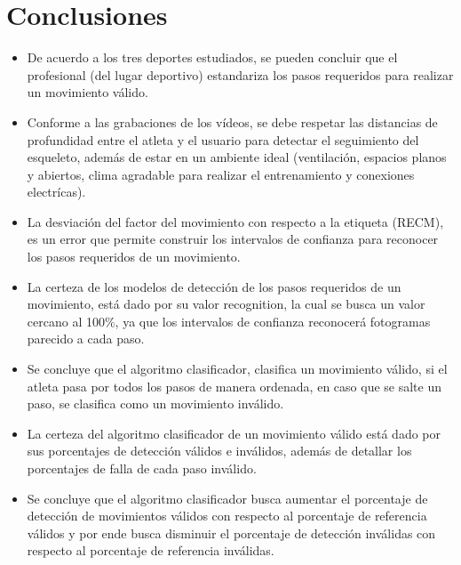 \section{Conclusiones} \label{ded:con}
\begin{itemize}
\item De acuerdo a los tres deportes estudiados, se pueden concluir que el profesional (del lugar deportivo) estandariza los pasos requeridos para realizar un movimiento v\'alido.
\item Conforme a las grabaciones de los v\'ideos, se debe respetar las distancias de profundidad entre el atleta y el usuario para detectar el seguimiento del esqueleto, adem\'as de estar en un ambiente ideal (ventilaci\'on, espacios planos y  abiertos, clima agradable para realizar el entrenamiento y conexiones electr\'icas).
\item La desviaci\'on del factor del movimiento con respecto a la etiqueta (RECM), es un error que  permite construir los intervalos de confianza para reconocer los pasos requeridos de un movimiento.
\item La certeza de los modelos de detecci\'on  de los pasos requeridos de un movimiento, est\'a dado por su valor recognition, la cual se busca un valor  cercano al 100\%, ya que los intervalos de confianza reconocer\'a fotogramas parecido a cada paso.
\item Se concluye que el algoritmo clasificador, clasifica un movimiento v\'alido, si el atleta pasa por todos los pasos de manera ordenada, en caso que se salte un paso, se clasifica como un movimiento inv\'alido.
\item La certeza del algoritmo clasificador de un movimiento v\'alido est\'a dado por sus porcentajes de detecci\'on v\'alidos e inv\'alidos, adem\'as de detallar los porcentajes de falla de cada paso inv\'alido.
\item Se concluye que el algoritmo clasificador busca aumentar el porcentaje de detecci\'on de movimientos v\'alidos con respecto al porcentaje de referencia v\'alidos y por ende busca disminuir el porcentaje de detecci\'on inv\'alidas con respecto al porcentaje de referencia inv\'alidas.
\end{itemize}